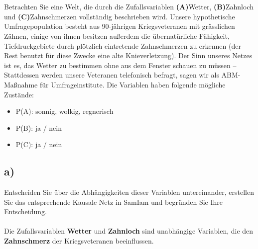 \documentclass[12pt, a4paper]{article}
\begin{document}
\maketitle
\newpage
\section{}
Betrachten Sie eine Welt, die durch die Zufallsvariablen \textbf{(A)}Wetter, \textbf{(B)}Zahnloch und \textbf{(C)}Zahnschmerzen vollständig beschrieben wird. Unsere hypothetische Umfragepopulation besteht aus 90-jährigen Kriegsveteranen mit grässlichen Zähnen, einige von ihnen besitzen außerdem die übernatürliche Fähigkeit, Tiefdruckgebiete durch plötzlich eintretende Zahnschmerzen zu erkennen (der Rest benutzt für diese Zwecke eine alte Knieverletzung). Der Sinn unseres Netzes ist es, das Wetter zu bestimmen ohne aus dem Fenster schauen zu müssen – Stattdessen werden unsere Veteranen telefonisch befragt, sagen wir als ABM-Maßnahme für Umfrageinstitute.
Die Variablen haben folgende mögliche Zustände:
\begin{itemize}
\item P(A): sonnig, wolkig, regnerisch
\item P(B): ja / nein
\item P(C): ja / nein
\end{itemize}


\subsection*{a)}
Entscheiden Sie über die Abhängigkeiten dieser Variablen untereinander, erstellen Sie das entsprechende Kausale Netz in SamIam und begründen Sie Ihre Entscheidung.
\\\\
Die Zufallsvariablen \textbf{Wetter} und \textbf{Zahnloch} sind unabhängige Variablen, die den \textbf{Zahnschmerz} der Kriegsveteranen beeinflussen.
\end{document}
